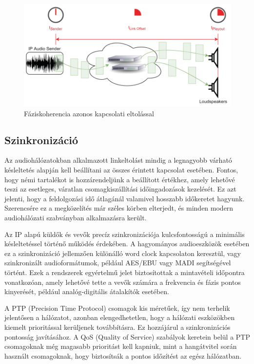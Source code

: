 \begin{figure}[H]
	\centering
	\includegraphics[width=\linewidth, keepaspectratio]{figures/phase_coherence_link_offset.png}
	\caption{Fáziskoherencia azonos kapcsolati eltolással \cite{AHNERT2023}}
	\label {fig:phase_coherence_link_offset}
\end{figure}
\subsection{Szinkronizáció}
Az audiohálózatokban alkalmazott linkeltolást mindig a legnagyobb várható késleltetés alapján 
kell beállítani az összes érintett kapcsolat esetében. Fontos, hogy némi tartalékot is 
hozzárendeljünk a beállított értékhez, amely lehetővé teszi az esetleges, váratlan csomagkiszállítási időingadozások kezelését. 
Ez azt jelenti, hogy a feldolgozási idő átlagánál valamivel hosszabb időkeretet hagyunk. 
Szerencsére ez a megközelítés már széles körben elterjedt, és minden modern audiohálózati szabványban alkalmazásra került.

Az IP alapú küldők és vevők precíz szinkronizációja kulcsfontosságú a minimális késleltetéssel történő működés érdekében. 
A hagyományos audioeszközök esetében ez a szinkronizáció jellemzően különálló word clock kapcsolaton keresztül, 
vagy szinkronizált audioformátumok, például AES/EBU vagy MADI segítségével történt. Ezek a rendszerek egyértelmű 
jelet biztosítottak a mintavételi időpontra vonatkozóan, amely lehetővé tette a vevők számára a frekvencia és 
fázis pontos kinyerését, például analóg-digitális átalakítók esetében.

A PTP (Precision Time Protocol) csomagok kis méretűek, így nem terhelik jelentősen a hálózatot, azonban 
elengedhetetlen, hogy a hálózati eszközökben kiemelt prioritással kerüljenek továbbításra. 
Ez hozzájárul a szinkronizációs pontosság javításához. A QoS (Quality of Service) szabályok keretein belül a 
PTP csomagoknak még magasabb prioritást kell kapniuk, mint a hangátvitel során használt csomagoknak, hogy 
biztosítsák a pontos időzítést az egész hálózatban.

